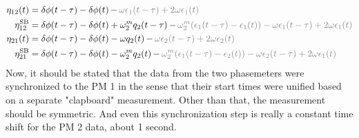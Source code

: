 \documentclass[11pt]{article}
\begin{document}
\begin{align*}
    \eta_{12}(t)&=\delta \phi(t-\tau)-\delta\phi(t) {\,-\,\color{gray}\omega\epsilon_1(t-\tau)+2\omega\epsilon_1(t)}\\
    \eta_{12}^{\text{SB}}&=\delta \phi(t-\tau)-\delta\phi(t) +\omega^m_2q_2(t-\tau) {\,-\,\color{gray}\omega^m_2(\epsilon_1(t-\tau)-\epsilon_1(t))-\omega\epsilon_1(t-\tau)+2\omega\epsilon_1(t)}\\
    \eta_{21}(t)&=\delta \phi(t-\tau)-\delta\phi(t)-\omega q_2(t) {\,-\,\color{gray}\omega\epsilon_2(t-\tau)+2\omega\epsilon_2(t)}\\
    \eta_{21}^{\text{SB}}&=\delta \phi(t-\tau)-\delta\phi(t)-\omega^m_2q_2(t) {\,-\,\color{gray}\omega^m_2(\epsilon_1(t-\tau)-\epsilon_2(t))-\omega\epsilon_2(t-\tau)+2\omega\epsilon_1(t)}
\end{align*}
Now, it should be stated that the data from the two phasemeters were synchronized to the PM 1 in the sense that their start times were unified based on a separate "clapboard" measurement. Other than that, the measurement should be symmetric. And even this synchronization step is really a constant time shift for the PM 2 data, about 1 second.\\
\end{document}

